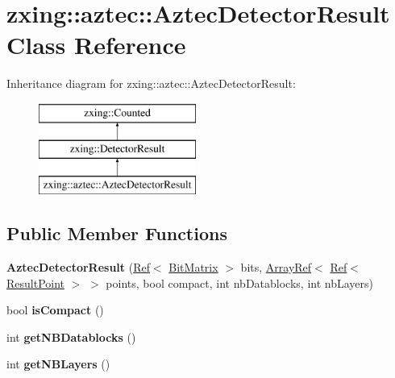 \hypertarget{classzxing_1_1aztec_1_1_aztec_detector_result}{}\section{zxing\+:\+:aztec\+:\+:Aztec\+Detector\+Result Class Reference}
\label{classzxing_1_1aztec_1_1_aztec_detector_result}
Inheritance diagram for zxing\+:\+:aztec\+:\+:Aztec\+Detector\+Result\+:\begin{figure}[H]
\begin{center}
\leavevmode
\includegraphics[height=3.000000cm]{classzxing_1_1aztec_1_1_aztec_detector_result}
\end{center}
\end{figure}
\subsection*{Public Member Functions}
\begin{DoxyCompactItemize}
\item 
\mbox{\label{classzxing_1_1aztec_1_1_aztec_detector_result_a21c614ad5626a2f819f1f86c3d1bec01}} 
{\bfseries Aztec\+Detector\+Result} (\mbox{\hyperlink{classzxing_1_1_ref}{Ref}}$<$ \mbox{\hyperlink{classzxing_1_1_bit_matrix}{Bit\+Matrix}} $>$ bits, \mbox{\hyperlink{classzxing_1_1_array_ref}{Array\+Ref}}$<$ \mbox{\hyperlink{classzxing_1_1_ref}{Ref}}$<$ \mbox{\hyperlink{classzxing_1_1_result_point}{Result\+Point}} $>$ $>$ points, bool compact, int nb\+Datablocks, int nb\+Layers)
\item 
\mbox{\label{classzxing_1_1aztec_1_1_aztec_detector_result_a4caeca331c9e6fa23f8ad349d26e3031}} 
bool {\bfseries is\+Compact} ()
\item 
\mbox{\label{classzxing_1_1aztec_1_1_aztec_detector_result_a7359034d4d8ba9801671d6e6fa47e4d3}} 
int {\bfseries get\+N\+B\+Datablocks} ()
\item 
\mbox{\label{classzxing_1_1aztec_1_1_aztec_detector_result_add977b8b16e7f523e09a786562a4e370}} 
int {\bfseries get\+N\+B\+Layers} ()
\end{DoxyCompactItemize}


